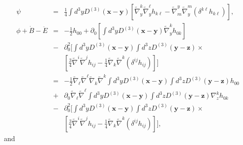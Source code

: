 %
\begin{eqnarray}
\psi&=&\frac{1}{4}\int d^3yD^{(3)}(\mathbf{x}-\mathbf{y})\left[\tilde{\nabla}_y^k \tilde{\nabla}_y^{\ell}h_{k\ell}-\tilde{\nabla}^y_m\tilde{\nabla}_y^m(\delta^{k\ell}h_{k\ell})\right],
\nonumber\\
\phi+\dot{B}-\ddot{E}&=&-\frac{1}{2} h_{00}
+\partial_0\left[\int d^3y D^{(3)}(\mathbf x - \mathbf y) \tilde\nabla^k_y h_{0k}\right]
\nonumber\\
&-&\partial_0^2\bigg[\int d^3y D^{(3)}(\mathbf x - \mathbf y) \int d^3z D^{(3)}(\mathbf y - \mathbf z)\times
\nonumber\\
&&\left[ \frac{3}{4} \tilde{\nabla}^i \tilde{\nabla}^jh_{ij}-\frac{1}{4}\tilde{\nabla}_k\tilde{\nabla}^k(\delta^{ij}h_{ij})
\right]\bigg]
\nonumber\\
&=&-\tfrac{1}{2}\tilde{\nabla}_{\ell}\tilde{\nabla}^{\ell} \tilde{\nabla}_k\tilde{\nabla}^k\int d^3y D^{(3)}(\mathbf x - \mathbf y) \int d^3z D^{(3)}(\mathbf y - \mathbf z)h_{00}
\nonumber\\
&+&\partial_0\tilde{\nabla}_{\ell}\tilde{\nabla}^{\ell}\int d^3y D^{(3)}(\mathbf x - \mathbf y) \int d^3z D^{(3)}(\mathbf y - \mathbf z)\nabla^k_z h_{0k}
\nonumber\\
&-&\partial_0^2\bigg[\int d^3y D^{(3)}(\mathbf x - \mathbf y) \int d^3z D^{(3)}(\mathbf y - \mathbf z)\times
\nonumber\\
&&\left[ \frac{3}{4} \tilde{\nabla}^i \tilde{\nabla}^jh_{ij}-\frac{1}{4}\tilde{\nabla}_k\tilde{\nabla}^k(\delta^{ij}h_{ij})
\right]\bigg],
\label{2.7}
\end{eqnarray}
%
and 
%
